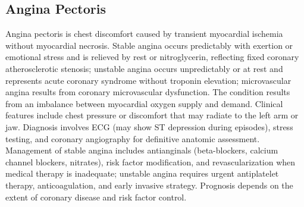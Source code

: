 






\label{sec:Coronary Artery Disease}

\subsection{Angina Pectoris}
\label{sec:Angina Pectoris}
Angina pectoris is chest discomfort caused by transient myocardial ischemia without myocardial necrosis. Stable angina occurs predictably with exertion or emotional stress and is relieved by rest or nitroglycerin, reflecting fixed coronary atherosclerotic stenosis; unstable angina occurs unpredictably or at rest and represents acute coronary syndrome without troponin elevation; microvascular angina results from coronary microvascular dysfunction. The condition results from an imbalance between myocardial oxygen supply and demand. Clinical features include chest pressure or discomfort that may radiate to the left arm or jaw. Diagnosis involves ECG (may show ST depression during episodes), stress testing, and coronary angiography for definitive anatomic assessment. Management of stable angina includes antianginals (beta-blockers, calcium channel blockers, nitrates), risk factor modification, and revascularization when medical therapy is inadequate; unstable angina requires urgent antiplatelet therapy, anticoagulation, and early invasive strategy. Prognosis depends on the extent of coronary disease and risk factor control.

